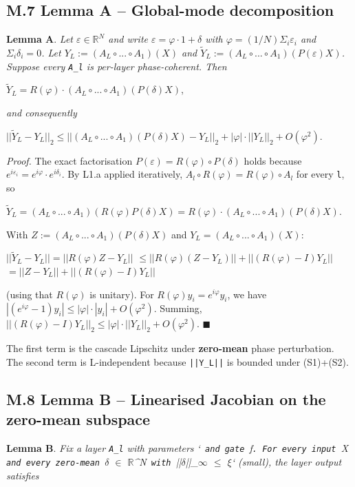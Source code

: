 \documentclass[11pt,a4paper]{article}
\theoremstyle{plain}
\theoremstyle{definition}
\begin{document}
\subsection{M.7 Lemma A -- Global-mode decomposition}
\textbf{Lemma A}. \emph{Let $\varepsilon  \in  \mathbb{R}^N$ and write $\varepsilon  = \varphi  \cdot  1 + \delta $ with $\varphi  = (1/N) \Sigma _i \varepsilon _i$ and $\Sigma _i \delta _i = 0$. Let $Y_L := (A_L \circ  ... \circ  A_1)(X)$ and $\tilde{Y}_L := (A_L \circ  ... \circ  A_1)(P(\varepsilon )X)$. Suppose every \texttt{A\_l} is per-layer phase-coherent. Then}

$\tilde{Y}_L = R(\varphi ) \cdot  (A_L \circ  ... \circ  A_1)(P(\delta )X)$,

\emph{and consequently}

$||\tilde{Y}_L - Y_L||_2 \le  ||(A_L \circ  ... \circ  A_1)(P(\delta )X) - Y_L||_2 + |\varphi | \cdot  ||Y_L||_2 + O(\varphi ^2)$.

\emph{Proof.} The exact factorisation $P(\varepsilon ) = R(\varphi ) \circ  P(\delta )$ holds because $e^{i\varepsilon _i} = e^{i\varphi } \cdot  e^{i\delta _i}$. By L1.a applied iteratively, $A_l \circ  R(\varphi ) = R(\varphi ) \circ  A_l$ for every \texttt{l}, so

$\tilde{Y}_L = (A_L \circ  ... \circ  A_1)(R(\varphi ) P(\delta )X) = R(\varphi ) \cdot  (A_L \circ  ... \circ  A_1)(P(\delta )X)$.

With $Z := (A_L \circ  ... \circ  A_1)(P(\delta )X)$ and $Y_L = (A_L \circ  ... \circ  A_1)(X)$:

$||\tilde{Y}_L - Y_L|| = ||R(\varphi ) Z - Y_L||$ $\le  ||R(\varphi )(Z - Y_L)|| + ||(R(\varphi ) - I) Y_L||$ $= ||Z - Y_L|| + ||(R(\varphi ) - I) Y_L||$

(using that $R(\varphi )$ is unitary). For $R(\varphi ) y_i = e^{i\varphi } y_i$, we have $|(e^{i\varphi } - 1) y_i| \le  |\varphi | \cdot  |y_i| + O(\varphi ^2)$. Summing, $||(R(\varphi ) - I) Y_L||_2 \le  |\varphi | \cdot  ||Y_L||_2 + O(\varphi ^2)$. $\blacksquare$

The first term is the cascade Lipschitz under \textbf{zero-mean} phase perturbation. The second term is L-independent because \texttt{||Y\_L||} is bounded under (S1)+(S2).

\subsection{M.8 Lemma B -- Linearised Jacobian on the zero-mean subspace}
\textbf{Lemma B}. \emph{Fix a layer \texttt{A\_l} with parameters `\texttt{ and gate }f\texttt{. For every input }X\texttt{ and every zero-mean }$\delta$ $\in$ $\mathbb{R}$\textasciicircum{}N\texttt{ with }||$\delta$||\_$\infty$ $\leq$ $\xi$` (small), the layer output satisfies}
\end{document}
